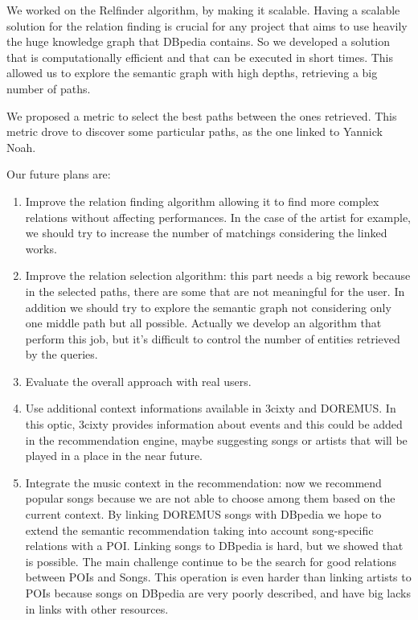 \documentclass[paper=a4, fontsize=11pt]{scrartcl}
\begin{document}
We worked on the Relfinder algorithm, by making it scalable. Having a scalable solution for the relation finding is crucial for any project that aims to use heavily the huge knowledge graph that DBpedia contains. So we developed a solution that is computationally efficient and that can be executed in short times. This allowed us to explore the semantic graph with high depths, retrieving a big number of paths.

We proposed a metric to select the best paths between the ones retrieved. This metric drove to discover some particular paths, as the one linked to Yannick Noah.

Our future plans are:
\begin{enumerate}
\item Improve the relation finding algorithm allowing it to find more complex relations without affecting performances. In the case of the artist for example, we should try to increase the number of matchings considering the linked works.
\item Improve the relation selection algorithm: this part needs a big rework because in the selected paths, there are some that are not meaningful for the user. In addition we should try to explore the semantic graph not considering only one middle path but all possible. Actually we develop an algorithm that perform this job, but it's difficult to control the number of entities retrieved by the queries.
\item Evaluate the overall approach with real users.
\item Use additional context informations available in 3cixty and DOREMUS. In this optic, 3cixty provides information about events and this could be added in the recommendation engine, maybe suggesting songs or artists that will be played in a place in the near future.
\item Integrate the music context in the recommendation: now we recommend popular songs because we are not able to choose among them based on the current context. By linking DOREMUS songs with DBpedia we hope to extend the semantic recommendation taking into account song-specific relations with a POI. Linking songs to DBpedia is hard, but we showed that is possible. The main challenge continue to be the search for good relations between POIs and Songs. This operation is even harder than linking artists to POIs because songs on DBpedia are very poorly described, and have big lacks in links with other resources.
\end{enumerate}


\end{document}
